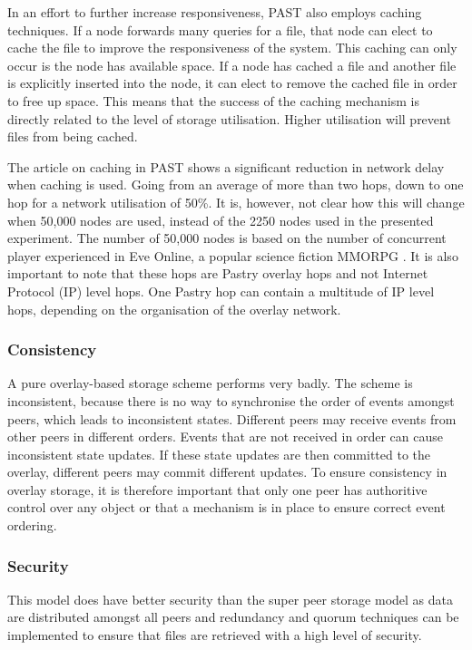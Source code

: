 \documentclass[10pt,a4paper,journal,cspaper,compsoc]{IEEEtran}
\begin{document}
In an effort to further increase responsiveness, PAST also employs caching techniques. If a node forwards many queries for a file, that node can
elect to cache the file to improve the responsiveness of the system. This caching can only occur is the node has available space. If a node has
cached a file and another file is explicitly inserted into the node, it can elect to remove the cached file in order to free up space. This means
that the success of the caching mechanism is directly related to the level of storage utilisation. Higher utilisation will prevent files from being
cached.

The article on caching in PAST shows a significant reduction in network delay when caching is used. Going from an average of more than two hops, down
to one hop for a network utilisation of 50\%. It is, however, not clear how this will change when 50,000 nodes are used, instead of the 2250 nodes
used in the presented experiment. The number of 50,000 nodes is based on the number of concurrent player experienced in Eve Online, a popular science
fiction MMORPG \cite{eve_pcu}. It is also important to note that these hops are Pastry overlay hops and not Internet Protocol (IP) level hops. One
Pastry hop can contain a multitude of IP level hops, depending on the organisation of the overlay network.


\subsubsection{Consistency}

A pure overlay-based storage scheme performs very badly. The scheme is inconsistent, because there is no way to synchronise the order of events
amongst peers, which leads to inconsistent states. Different peers may receive events from other peers in different orders. Events that are not
received in order can cause inconsistent state updates. If these state updates are then committed to the overlay, different peers may commit
different updates. To ensure consistency in overlay storage, it is therefore important that only one peer has authoritive control over any object or
that a mechanism is in place to ensure correct event ordering.

\subsubsection{Security}
This model does have better security than the super peer storage model as data are distributed amongst all peers and redundancy and quorum techniques
can be implemented to ensure that files are retrieved with a high level of security.
\end{document}
